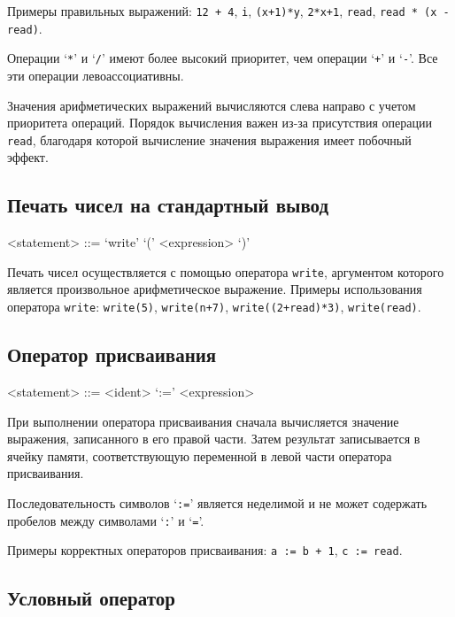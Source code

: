 \documentclass[a4paper,12pt]{article}
\begin{document}
Примеры правильных выражений: \texttt{12 + 4}, \texttt{i}, \texttt{(x+1)*y},
\texttt{2*x+1}, \texttt{read}, \texttt{read * (x - read)}.

Операции `\texttt{*}' и `\texttt{/}' имеют более высокий приоритет, чем
операции `\texttt{+}' и `\texttt{-}'. Все эти операции левоассоциативны.

Значения арифметических выражений вычисляются слева направо с учетом приоритета
операций. Порядок вычисления важен из-за присутствия операции \texttt{read},
благодаря которой вычисление значения выражения имеет побочный эффект.

\subsection{Печать чисел на стандартный вывод}

\begin{grammar}
<statement> ::= `write' `(' <expression> `)'
\end{grammar}

Печать чисел осуществляется с помощью оператора \texttt{write}, аргументом
которого является произвольное арифметическое выражение. Примеры использования
оператора \texttt{write}: \texttt{write(5)},
\texttt{write(n+7)}, \texttt{write((2+read)*3)}, \texttt{write(read)}.

\subsection{Оператор присваивания}

\begin{grammar}
<statement> ::= <ident> `:=' <expression>
\end{grammar}

При выполнении оператора присваивания сначала вычисляется значение выражения,
записанного в его правой части. Затем результат записывается в ячейку памяти,
соответствующую переменной в левой части оператора присваивания.

Последовательность символов `\texttt{:=}' является неделимой и не может
содержать пробелов между символами `\texttt{:}' и `\texttt{=}'.

Примеры корректных операторов присваивания: \texttt{a := b + 1}, \texttt{c :=
read}.

\subsection{Условный оператор}
\end{document}
